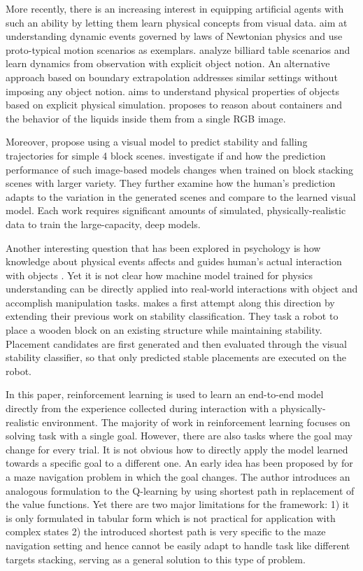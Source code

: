 \documentclass{article} %
\begin{document}
More recently, there is an increasing interest in equipping artificial agents with such an ability by letting them learn physical concepts from visual data. 
\cite{mottaghi2015newtonian} aim at understanding dynamic events governed by laws of Newtonian physics and use proto-typical motion scenarios as exemplars. \cite{fragkiadaki2015learning} analyze billiard table scenarios and learn dynamics from observation with explicit object notion. 
An alternative approach based on boundary extrapolation \cite{apratim16ariv} addresses similar settings without imposing any object notion. 
\cite{wu2015galileo} aims to understand physical properties of objects based on explicit physical simulation. 
\cite{mottaghi2017see} proposes to reason about containers and the behavior of the liquids inside them from a single RGB image.

Moreover, \cite{fergus16blocsarxiv} propose using a visual model to predict stability and falling trajectories for simple 4 block scenes. \cite{li2016fall} investigate if and how the prediction performance of such image-based models changes when trained on block stacking scenes with larger variety. They further examine how the human's prediction adapts to the variation in the generated scenes and compare to the learned visual model. Each work requires significant amounts of simulated, physically-realistic data to train the large-capacity, deep models.

Another interesting question that has been explored in psychology is how knowledge about physical events affects and guides human's actual interaction with objects \cite{yildirim2017physical}. 
Yet it is not clear how machine model trained for physics understanding can be directly applied into real-world interactions with object and accomplish manipulation tasks.  
\cite{li2017visual} makes a first attempt along this direction by extending their previous work \citep{li2016fall} on stability classification. They task a robot to place a wooden block on an existing structure while maintaining stability. Placement candidates are first generated and then evaluated through the visual stability classifier, so that only predicted stable placements are executed on the robot. 

In this paper, reinforcement learning is used to learn an end-to-end model directly from the experience collected during interaction with a physically-realistic environment.
The majority of work in reinforcement learning focuses on solving task with a single goal. However, there are also tasks where the goal may change for every trial. It is not obvious how to directly apply the model learned towards a specific goal to a different one. An early idea has been proposed by \cite{kaelbling1993learning} for a maze navigation problem in which the goal changes. The author introduces an analogous formulation to the Q-learning by using shortest path in replacement of the value functions. 
Yet there are two major limitations for the framework: 1) it is only formulated in tabular form which is not practical for application with complex states 2) the introduced shortest path is very specific to the maze navigation setting and hence cannot be easily adapt to handle task like different targets stacking, serving as a general solution to this type of problem. 
\end{document}
